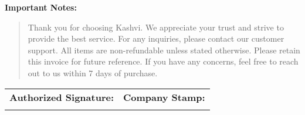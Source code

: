 \documentclass{article}
\begin{document}
        \noindent
        \textbf{Important Notes:} \\[0.5em]
        \begin{quote}
            Thank you for choosing Kashvi. We appreciate your trust and strive to provide the best service.  
            For any inquiries, please contact our customer support.  
            All items are non-refundable unless stated otherwise.  
            Please retain this invoice for future reference.  
            If you have any concerns, feel free to reach out to us within 7 days of purchase.
        \end{quote}

        \vspace{1em}

        \noindent
        \begin{tabular}{@{}p{}p{}@{}}
            \textbf{Authorized Signature:} & \textbf{Company Stamp:} \\
            \vspace{2cm} & \vspace{2cm} \\
        \end{tabular}

        
\end{document}
